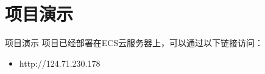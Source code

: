 \section{项目演示}
    \begin{frame}{项目演示}
        项目已经部署在ECS云服务器上，可以通过以下链接访问：
        \begin{itemize}
            \item {http://124.71.230.178} 
        \end{itemize}
    \end{frame}




